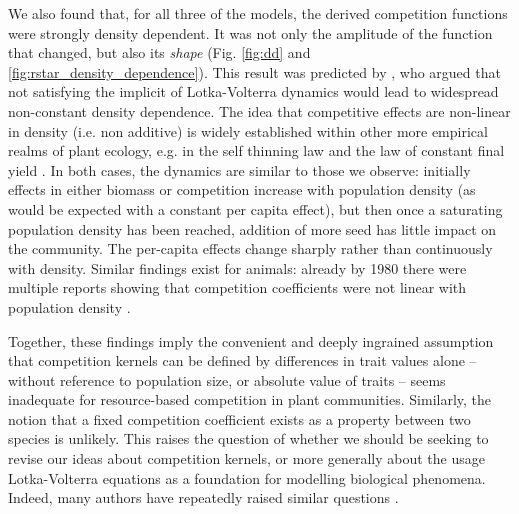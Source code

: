 \documentclass[a4paper,11pt]{article}
\begin{document}
We also found that, for all three of the models, the derived
competition functions were strongly density dependent. It was not only
the amplitude of the function that changed, but also its \emph{shape}
(Fig. \ref{fig:dd} and \ref{fig:rstar_density_dependence}).
%
This result was predicted by \citet{Abrams-1980}, who argued that not
satisfying the implicit of Lotka-Volterra dynamics would lead to
widespread non-constant density dependence. The idea that competitive
effects are non-linear in density (i.e. non additive) is widely
established within other more empirical realms of plant ecology, e.g.
in the self thinning law and the law of constant
final yield \citep{Harper-1977}.
In both cases, the dynamics are similar to those we observe: initially
effects in either biomass or competition increase with population
density (as would be expected with a constant per capita effect), but
then once a saturating population density has been reached, addition
of more seed has little impact on the community. The
per-capita effects change sharply rather than continuously with density. Similar findings exist
for animals: already by 1980 there were multiple reports showing that
competition coefficients were not linear with population density
\citep{Abrams-1980}.

Together, these findings imply the convenient and deeply ingrained assumption that
competition kernels can be defined by differences in trait values
alone -- without reference to population size, or absolute value of
traits -- seems inadequate for resource-based competition in plant
communities.
Similarly, the notion that a fixed competition coefficient exists as a
property between two species is unlikely. This raises the question of
whether we should be seeking to revise our ideas about competition
kernels, or more generally about the usage Lotka-Volterra equations as
a foundation for modelling biological phenomena.  Indeed, many authors
have repeatedly raised similar questions \citep[e.g.][]{Andrewartha-1953,
  Neill-1974, Abrams-1975, Wangersky-1978,Abrams-1980, Tilman-1987,
  Abrams-2008}.
\end{document}
